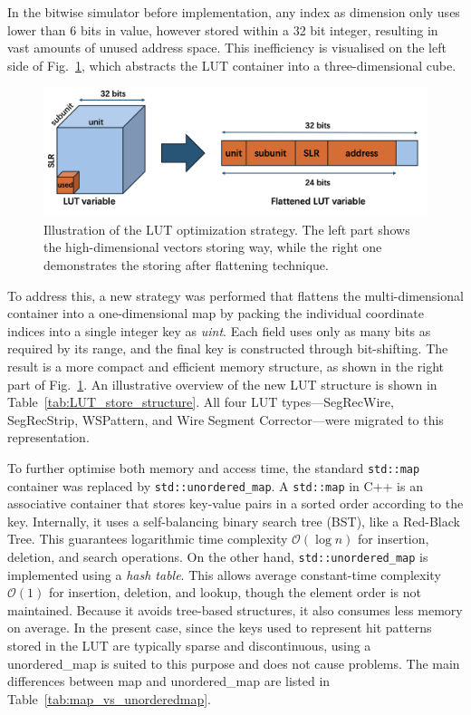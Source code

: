 In the bitwise simulator before implementation, any index as dimension only uses lower than 6 bits in value, however stored within a 32 bit integer, resulting in vast amounts of unused address space. This inefficiency is visualised on the left side of Fig.~\ref{fig:LUT_optimization}, which abstracts the LUT container into a three-dimensional cube.
\begin{figure}[htbp]
  \centering
  \includegraphics[width=1.0\textwidth]{figs/chapter5/LUT_optimization.png}
  \caption{Illustration of the LUT optimization strategy. The left part shows the high-dimensional vectors storing way, while the right one demonstrates the storing after flattening technique.}
  \label{fig:LUT_optimization}
\end{figure}

To address this, a new strategy was performed that flattens the multi-dimensional container into a one-dimensional map by packing the individual coordinate indices into a single integer key as \textit{uint}. Each field uses only as many bits as required by its range, and the final key is constructed through bit-shifting. The result is a more compact and efficient memory structure, as shown in the right part of Fig.~\ref{fig:LUT_optimization}. An illustrative overview of the new LUT structure is shown in Table~\ref{tab:LUT_store_structure}. All four LUT types—SegRecWire, SegRecStrip, WSPattern, and Wire Segment Corrector—were migrated to this representation.


To further optimise both memory and access time, the standard \texttt{std::map} container was replaced by \texttt{std::unordered\_map}. A \texttt{std::map} in C++ is an associative container that stores key-value pairs in a sorted order according to the key. Internally, it uses a self-balancing binary search tree (BST), like a Red-Black Tree. This guarantees logarithmic time complexity $\mathcal{O}(\log n)$ for insertion, deletion, and search operations. On the other hand, \texttt{std::unordered\_map} is implemented using a \textit{hash table}. This allows average constant-time complexity $\mathcal{O}(1)$ for insertion, deletion, and lookup, though the element order is not maintained. Because it avoids tree-based structures, it also consumes less memory on average. In the present case, since the keys used to represent hit patterns stored in the LUT are typically sparse and discontinuous, using a unordered\_map is suited to this purpose and does not cause problems. The main differences between map and unordered\_map are listed in Table~\ref{tab:map_vs_unorderedmap}.


